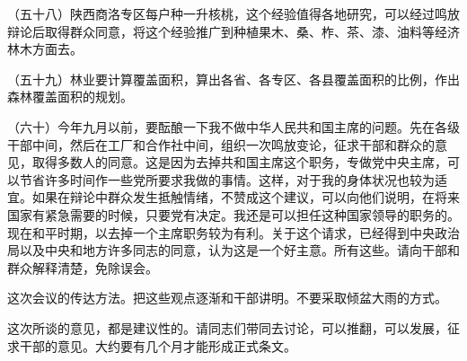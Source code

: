 （五十八）陕西商洛专区每户种一升核桃，这个经验值得各地研究，可以经过鸣放辩论后取得群众同意，将这个经验推广到种植果木、桑、柞、茶、漆、油料等经济林木方面去。

（五十九）林业要计算覆盖面积，算出各省、各专区、各县覆盖面积的比例，作出森林覆盖面积的规划。

（六十）今年九月以前，要酝酿一下我不做中华人民共和国主席的问题。先在各级干部中间，然后在工厂和合作社中间，组织一次鸣放变论，征求干部和群众的意见，取得多数人的同意。这是因为去掉共和国主席这个职务，专做党中央主席，可以节省许多时间作一些党所要求我做的事情。这样，对于我的身体状况也较为适宜。如果在辩论中群众发生抵触情绪，不赞成这个建议，可以向他们说明，在将来国家有紧急需要的时候，只要党有决定。我还是可以担任这种国家领导的职务的。现在和平时期，以去掉一个主席职务较为有利。关于这个请求，已经得到中央政治局以及中央和地方许多同志的同意，认为这是一个好主意。所有这些。请向干部和群众解释清楚，免除误会。

这次会议的传达方法。把这些观点逐渐和干部讲明。不要采取倾盆大雨的方式。

这次所谈的意见，都是建议性的。请同志们带同去讨论，可以推翻，可以发展，征求干部的意见。大约要有几个月才能形成正式条文。

